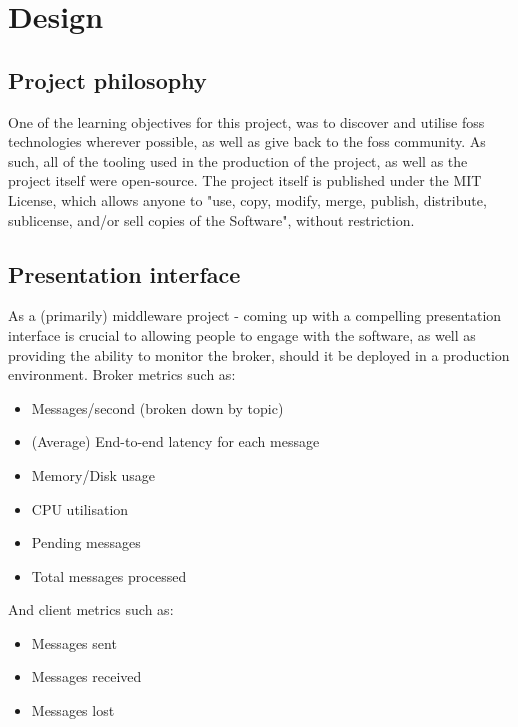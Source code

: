 \chapter{Design}
\label{chap:Design}

\section{Project philosophy}
\label{sec:Project philosophy}

One of the learning objectives for this project, was to discover and utilise
\gls{foss} technologies wherever possible, as well as give back to the
\gls{foss} community. As such, all of the tooling used in the production of the
project, as well as the project itself were open-source. The project itself is
published under the MIT License, which allows anyone to "use, copy, modify,
merge, publish, distribute, sublicense, and/or sell copies of the Software",
without restriction.

\section{Presentation interface}
\label{sec:presentation}

As a (primarily) middleware project - coming up with a compelling presentation
interface is crucial to allowing people to engage with the software, as well as
providing the ability to monitor the broker, should it be deployed in a
production environment. Broker metrics such as:

\begin{itemize}
  \item Messages/second (broken down by topic)
  \item (Average) End-to-end latency for each message
  \item Memory/Disk usage
  \item CPU utilisation
  \item Pending messages
  \item Total messages processed
\end{itemize}

\noindent
And client metrics such as:

\begin{itemize}
  \item Messages sent
  \item Messages received
  \item Messages lost
\end{itemize}

